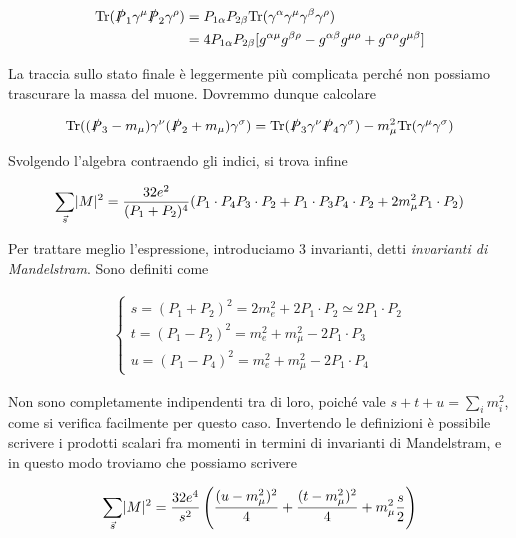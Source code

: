 \documentclass[11pt]{report}
\begin{document}
\begin{align}
    \text{Tr}(\slashed{P}_1\gamma^\mu \slashed{P}_2\gamma^\rho) &= P_{1\alpha}P_{2\beta} \text{Tr}(\gamma^\alpha\gamma^\mu\gamma^\beta\gamma^\rho) \\
    &= 4P_{1\alpha}P_{2\beta}[g^{\alpha\mu}g^{\beta\rho} - g^{\alpha\beta}g^{\mu\rho} + g^{\alpha\rho}g^{\mu\beta}]
\end{align}

La traccia sullo stato finale è leggermente più complicata perché non possiamo trascurare la massa del muone. Dovremmo dunque calcolare 

\begin{align}
    \text{Tr}((\slashed{P}_3 - m_\mu)\gamma^{\nu}(\slashed{P}_2 +m_\mu)\gamma^{\sigma}) = \text{Tr}(\slashed{P}_3\gamma^\nu\slashed{P}_4\gamma^\sigma) - m^2_\mu \text{Tr}(\gamma^\mu\gamma^\sigma)
\end{align}

Svolgendo l'algebra contraendo gli indici, si trova infine 

\begin{align}
    \sum_{\vec{s}}\lvert M\rvert^2 = \frac{32e^2}{(P_1+P_2)^4}(P_1\cdot P_4 P_3\cdot P_2 + P_1\cdot P_3 P_4\cdot P_2 + 2m^2_\mu P_1\cdot P_2) 
\end{align}

Per trattare meglio l'espressione, introduciamo 3 invarianti, detti \emph{invarianti di Mandelstram}. Sono definiti come 

\begin{align}
    \begin{cases}
        s = (P_1 + P_2)^2 = 2m_e^2 + 2P_1\cdot P_2 \simeq 2P_1\cdot P_2 \\
        t = (P_1-P_2)^2 = m_e^2 + m_\mu^2 -2P_1 \cdot P_3 \\
        u = (P_1 - P_4)^2 = m_e^2 + m_\mu^2 - 2P_1\cdot P_4
    \end{cases}
\end{align}

Non sono completamente indipendenti tra di loro, poiché vale \(s+t+u = \sum_i m_i^2\), come si verifica facilmente per questo caso. Invertendo le definizioni è possibile scrivere i prodotti scalari fra momenti in termini di invarianti di Mandelstram, e in questo modo troviamo che possiamo scrivere 

\begin{align}
    \sum_{\vec{s}}\lvert M\rvert^2 = \frac{32e^4}{s^2}\left(\frac{(u-m^2_\mu)^2}{4} + \frac{(t-m^2_\mu)^2}{4} + m^2_\mu \frac{s}{2}\right)
\end{align}
\end{document}
